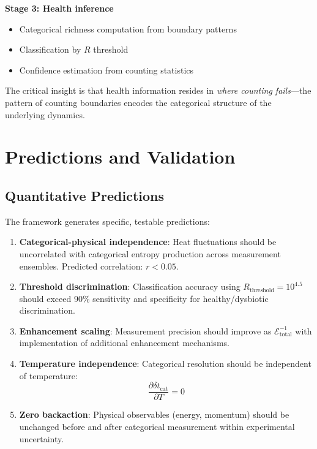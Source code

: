 \documentclass[twocolumn,10pt]{article}
\begin{document}
\textbf{Stage 3: Health inference}
\begin{itemize}
    \item Categorical richness computation from boundary patterns
    \item Classification by $R$ threshold
    \item Confidence estimation from counting statistics
\end{itemize}

The critical insight is that health information resides in \textit{where counting fails}---the pattern of counting boundaries encodes the categorical structure of the underlying dynamics.

\section{Predictions and Validation}

\subsection{Quantitative Predictions}

The framework generates specific, testable predictions:

\begin{enumerate}
    \item \textbf{Categorical-physical independence}: Heat fluctuations should be uncorrelated with categorical entropy production across measurement ensembles. Predicted correlation: $r < 0.05$.

    \item \textbf{Threshold discrimination}: Classification accuracy using $R_{\text{threshold}} = 10^{4.5}$ should exceed 90\% sensitivity and specificity for healthy/dysbiotic discrimination.

    \item \textbf{Enhancement scaling}: Measurement precision should improve as $\mathcal{E}_{\text{total}}^{-1}$ with implementation of additional enhancement mechanisms.

    \item \textbf{Temperature independence}: Categorical resolution should be independent of temperature:
    \begin{equation}
        \frac{\partial \delta t_{\text{cat}}}{\partial T} = 0
    \end{equation}

    \item \textbf{Zero backaction}: Physical observables (energy, momentum) should be unchanged before and after categorical measurement within experimental uncertainty.
\end{enumerate}
\end{document}
